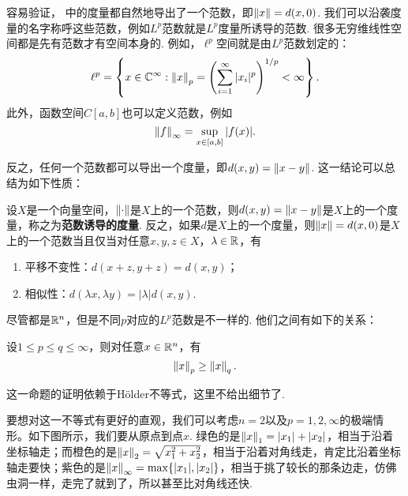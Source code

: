容易验证， 中的度量都自然地导出了一个范数，即$\left\|x\right\|=d(x,0)$. 我们可以沿袭度量的名字称呼这些范数，例如$L^p$范数就是$L^p$度量所诱导的范数. 很多无穷维线性空间都是先有范数才有空间本身的. 例如，$\ell^p$空间就是由$L^p$范数划定的：
\[ \ell^p=\left\{x\in\mathbb{C}^\infty:\left\|x\right\|_p=\left(\sum_{i=1}^\infty|x_i|^p\right)^{1/p}<\infty\right\}. \]
此外，函数空间$C[a,b]$也可以定义范数，例如
\[ \left\|f\right\|_\infty=\sup_{x\in[a,b]}|f(x)|. \]

反之，任何一个范数都可以导出一个度量，即$d(x,y)=\left\|x-y\right\|$. 这一结论可以总结为如下性质：

\begin{proposition}\label{prop:metric-norm}
    设$X$是一个向量空间，$\left\|\cdot\right\|$是$X$上的一个范数，则$d(x,y)=\left\|x-y\right\|$是$X$上的一个度量，称之为\textbf{范数诱导的度量}. 反之，如果$d$是$X$上的一个度量，则$\left\|x\right\|=d(x,0)$是$X$上的一个范数当且仅当对任意$x,y,z\in X$，$\lambda\in\mathbb{R}$，有
    \begin{enumerate}
        \item 平移不变性：$d(x+z,y+z)=d(x,y)$；
        \item 相似性：$d(\lambda x,\lambda y)=|\lambda|d(x,y)$.
    \end{enumerate}
\end{proposition}

尽管都是$\mathbb{R}^n$，但是不同$p$对应的$L^p$范数是不一样的. 他们之间有如下的关系：

\begin{proposition}\label{prop:lp-norm}
    设$1\leq p\leq q\leq \infty$，则对任意$x\in\mathbb{R}^n$，有
    \[\left\|x\right\|_p\geq \left\|x\right\|_q.\]
\end{proposition}

这一命题的证明依赖于H\"older不等式，这里不给出细节了. 

要想对这一不等式有更好的直观，我们可以考虑$n=2$以及$p=1,2,\infty$的极端情形。如下图所示，我们要从原点到点$x$. 绿色的是$\left\|x\right\|_1=|x_1|+|x_2|$，相当于沿着坐标轴走；而橙色的是$\left\|x\right\|_2=\sqrt{x_1^2+x_2^2}$，相当于沿着对角线走，肯定比沿着坐标轴走要快；紫色的是$\left\|x\right\|_\infty=\max\{|x_1|,|x_2|\}$，相当于挑了较长的那条边走，仿佛虫洞一样，走完了就到了，所以甚至比对角线还快. 

\begin{center}
\end{center}


